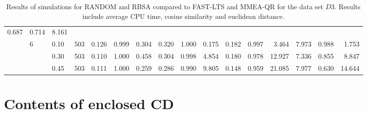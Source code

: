 \documentclass[thesis=B,english]{FITthesis}[2012/10/20]
\begin{document}
\begin{table}[h!]
\begin{adjustbox}{angle=90}
{\begin{tabular}{ll|l|l|r|r|r|r|r|r|r|r|r|r|r|r|}
0.687 &  0.714 &   8.161 \\     & 6 & 0.10 & 503 &    0.126 &  0.999 &  0.304 &   0.320 &  1.000 &  0.175 &  0.182 &  0.997 &   3.464 &  7.973 &  0.988 &   1.753 \\     &   & 0.30 & 503 &    0.110 &  1.000 &  0.458 &   0.304 &  0.998 &  4.854 &  0.180 &  0.978 &  12.927 &  7.336 &  0.855 &   8.847 \\     &   & 0.45 & 503 &    0.111 &  1.000 &  0.259 &   0.286 &  0.990 &  9.805 &  0.148 &  0.959 &  21.085 &  7.977 &  0.630 &  14.644 \\
                         
                 \hline
                \end{tabular}
			}
			
\end{adjustbox}
    
    \caption{Results of simulations for RANDOM and RBSA  compared to FAST-LTS and MMEA-QR for the data set $D3$. Results include average CPU time, cosine similarity and euclidean distance.}
    \label{table:randim:3}
\end{table}







\chapter{Contents of enclosed CD}
\begin{figure}
\end{figure}
\end{document}
